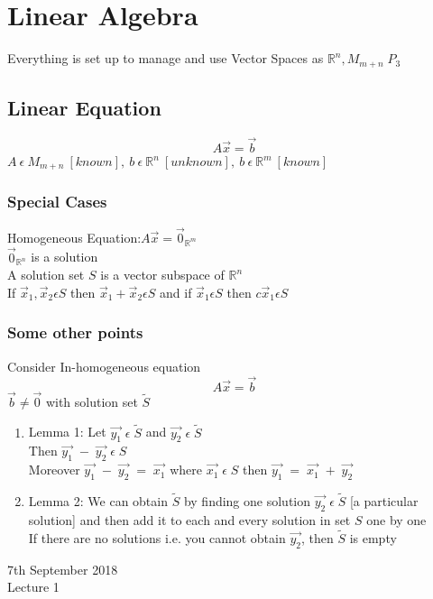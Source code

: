 \documentclass[11pt]{article}
\theoremstyle{definition}
\newcommand{\R}{\mathbb{R}}
\begin{document}
\section{Linear Algebra}
Everything is set up to manage and use Vector Spaces as $\R^n, M_{m+n} \; P_3$
\subsection{Linear Equation}
$$A\vec{x} = \vec{b}$$ 
$A\:  \epsilon\:  M_{m+n}\: [known],\: b\: \epsilon\: \R^n\:  [unknown],\: b\: \epsilon\:  \R^m\:  [known]$
\subsubsection{Special Cases}
Homogeneous Equation:$A\vec{x} = \vec{0}_{\R^m}$\\
$\vec{0}_{\R^n}$ is a solution\\
A solution set \textbf{$S$} is a vector subspace of $\R^n$\\
If $\vec{x}_1, \vec{x}_2 \epsilon S$ then $\vec{x}_1 + \vec{x}_2 \epsilon S$ and if $\vec{x}_1 \epsilon S $ then $ c\vec{x}_1 \epsilon S$
\subsubsection{Some other points}
Consider In-homogeneous equation $$A\vec{x} = \vec{b}$$ 
$\vec{b} \neq \vec{0}$ with  solution set $\tilde{S}$
\begin{enumerate}
    \item Lemma 1: Let $\vec{y_1}\; \epsilon\; \tilde{S}$ and $\vec{y_2}\; \epsilon\; \tilde{S}$\\
    Then $\vec{y_1}\; -\; \vec{y_2}\; \epsilon\; S$\\
    Moreover $\vec{y_1}\; -\; \vec{y_2}\; =\; \vec{x_1}$ where $\vec{x_1}\; \epsilon\; S$ then $\vec{y_1}\; =\; \vec{x_1}\; +\; \vec{y_2}$
    \item Lemma 2: We can obtain $\tilde{S}$ by finding one solution $\vec{y_2}\; \epsilon\; \tilde{S}$ [a particular solution] and then add it to each and every solution in set $S$ one by one\\
    If there are no solutions i.e. you cannot obtain $\vec{y_2}$, then $\tilde{S}$ is empty
\end{enumerate}
\newpage
\begin{center}
    {\LARGE 7th September 2018 \\ Lecture 1}
\end{center}
\setcounter{section}{0}
\end{document}
